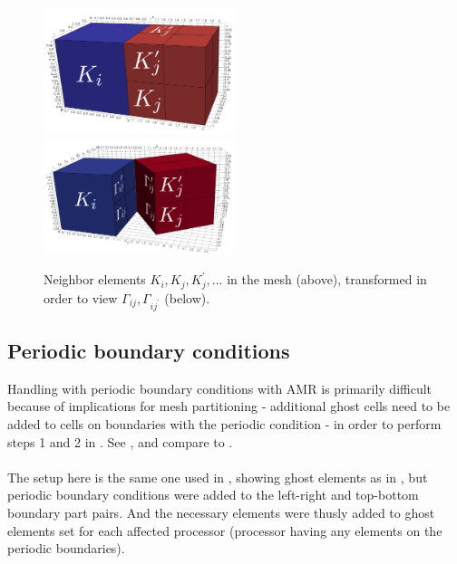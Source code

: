 \begin{figure}[H]
		\begin{center}
			\includegraphics[width=0.5\textwidth]{img/mesh/neighborsOneLargerK.jpg}
			\vspace{3mm}
			\includegraphics[width=0.5\textwidth]{img/mesh/neighborsOneLargerSepK.jpg}
			\vspace{-5mm}
		\caption{Neighbor elements $K_i, K_j, K_j^{'}, ...$ in the mesh (above), transformed in order to view $\Gamma_{ij}, \Gamma_{i{j^{'}}}$ (below).}
		\label{figure:worseNeighbors}
		\end{center}
	\end{figure}\vspace{-5mm}

\subsection{Periodic boundary conditions}
\label{amrPer}
Handling with periodic boundary conditions with AMR is primarily difficult because of implications for mesh partitioning - additional ghost cells need to be added to cells on boundaries with the periodic condition - in order to perform steps 1 and 2 in . See , and compare to .

\paragraph{}
The setup here is the same one used in , showing ghost elements as in , but periodic boundary conditions were added to the left-right and top-bottom boundary part pairs. And the necessary elements were thusly added to ghost elements set for each affected processor (processor having any elements on the periodic boundaries).

